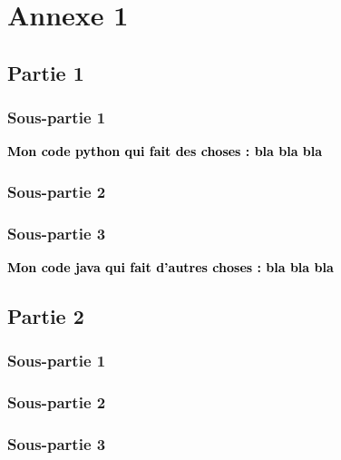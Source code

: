 \appendix

\section{Annexe 1}
\label{sec:annexe1}

\subsection{Partie 1}
\label{ssec:annexe1_partie1}
\subsubsection{Sous-partie 1}
\label{sssec:annexe1_partie1_sous1}
\begin{center}
    \textcolor{black}{\textbf{Mon code python qui fait des choses : bla bla bla}}
\end{center}

\subsubsection{Sous-partie 2}
\label{sssec:annexe1_partie1_sous2}
\subsubsection{Sous-partie 3}
\label{sssec:annexe1_partie1_sous3}
\begin{center}
    \textcolor{black}{\textbf{Mon code java qui fait d'autres choses : bla bla bla}}
\end{center}



\subsection{Partie 2}
\label{ssec:annexe1_partie2}
\subsubsection{Sous-partie 1}
\label{sssec:annexe1_partie2_sous1}
\subsubsection{Sous-partie 2}
\label{sssec:annexe1_partie2_sous2}
\subsubsection{Sous-partie 3}
\label{sssec:annexe1_partie2_sous3}

